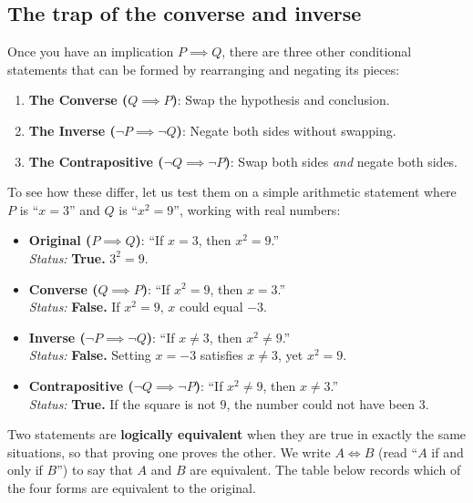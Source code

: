\subsection{The trap of the converse and inverse}

Once you have an implication $P \implies Q$, there are three other conditional statements that can be formed by rearranging and negating its pieces:

\begin{enumerate}
\item \textbf{The Converse ($Q \implies P$)}: Swap the hypothesis and conclusion.
\item \textbf{The Inverse ($\neg P \implies \neg Q$)}: Negate both sides without swapping.
\item \textbf{The Contrapositive ($\neg Q \implies \neg P$)}: Swap both sides \emph{and} negate both sides.
\end{enumerate}

To see how these differ, let us test them on a simple arithmetic statement where $P$ is ``$x = 3$'' and $Q$ is ``$x^2 = 9$'', working with real numbers:
\begin{itemize}
\item \textbf{Original ($P \implies Q$)}: ``If $x = 3$, then $x^2 = 9$.'' \\
\emph{Status:} \textbf{True.} $3^2 = 9$.
\item \textbf{Converse ($Q \implies P$)}: ``If $x^2 = 9$, then $x = 3$.'' \\
\emph{Status:} \textbf{False.} If $x^2 = 9$, $x$ could equal $-3$.
\item \textbf{Inverse ($\neg P \implies \neg Q$)}: ``If $x \neq 3$, then $x^2 \neq 9$.'' \\
\emph{Status:} \textbf{False.} Setting $x = -3$ satisfies $x \neq 3$, yet $x^2 = 9$.
\item \textbf{Contrapositive ($\neg Q \implies \neg P$)}: ``If $x^2 \neq 9$, then $x \neq 3$.'' \\
\emph{Status:} \textbf{True.} If the square is not $9$, the number could not have been $3$.
\end{itemize}

Two statements are \textbf{logically equivalent} when they are true in exactly the same situations, so that proving one proves the other. We write $A \iff B$ (read ``$A$ if and only if $B$'') to say that $A$ and $B$ are equivalent. The table below records which of the four forms are equivalent to the original.

